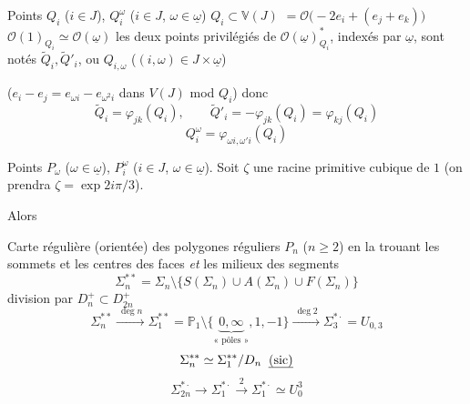 \documentclass[11pt,a4paper]{article}
\begin{document}
Points $Q_i$ ($i \in J$), $Q^\omega_i$ ($i \in J$, $\omega \in \underline\omega$)
$Q_i \subset \mathbb{V}(J)$ $= \mathcal{O}\bigl(-2e_i + (e_j + e_k)\bigr)$
\qquad $\mathcal{O}(1)_{Q_i} \simeq \mathcal{O}(\underline\omega)$
les deux points privilégiés de $\mathcal{O}(\underline\omega)^*_{Q_i}$, indexés par $\underline\omega$, sont notés $\tilde Q_i, \tilde Q'_i$, ou $Q_{i,\omega}$ ($(i,\omega) \in J \times \underline\omega$)

($e_i - e_j = e_{\omega i} - e_{\omega^2 i}$ dans $V(J)$ mod $Q_i$)
donc \ill{} 
\[
  \tilde Q_i = \varphi_{jk}(Q_i), \qquad \tilde Q'_i = -\varphi_{jk}(Q_i) = \varphi_{kj}(Q_i)
\]
\[
  \boxed{Q^\omega_{i} = \varphi_{\omega i, \omega' i}(Q_i)}
\]

Points $P_\omega$ ($\omega \in \underline\omega$), $P^\omega_i$ ($i \in J$, $\omega \in \underline\omega$). Soit $\zeta$ une racine primitive cubique de $1$ (on prendra $\zeta = \exp 2i\pi/3$).

Alors


Carte régulière (orientée) des polygones réguliers $P_n$ ($n \geq 2$) en la trouant  les sommets et les centres des faces \emph{et} les milieux \add{\uncertain{\ill{}}} des segments
\[
  \Sigma_n^{\ast\ast} = \Sigma_n \setminus \bigl\{ S(\Sigma_n) \cup A(\Sigma_n) \cup F(\Sigma_n) \bigr\}
\]
division par $D_n^+ \subset D_{2n}^+$
\[
  \Sigma_n^{\ast\ast} \xrightarrow{\ \deg n\ } \Sigma_1^{\ast\ast} = \mathbb{P}_1 \setminus \{\underbrace{0, \infty}_{\text{« pôles »}}, 1, -1\}
  \xrightarrow{\ \deg 2\ } \Sigma_3^{\ast\cdot} = U_{0,3}
\]
\[
  \Sigma_n^{\ast\ast} \simeq \Sigma_1^{\ast\ast}/D_n \;\; \text{\uncertain{(sic)}}
\]
\[
  \Sigma_{2n}^{\ast\cdot} \longrightarrow \Sigma_1^{\ast\cdot} \xrightarrow{\ 2\ } \Sigma_1^{\ast\cdot} \simeq U_0^3
\]
\end{document}
